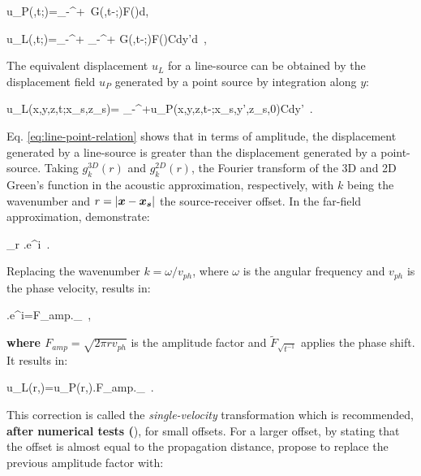 \documentclass[extra,mreferee]{gji}
\newenvironment{greennote}{\par\color{OliveGreen}}{\par}
\begin{document}
\begin{greennote}
\equation
u_{P}(,t;)=\int_{-\infty}^{+\infty}\ G(,t-\tau;)F(\tau)d\tau, 
\label{eq:point-displacement}
\endequation

\equation
u_{L}(,t;)=\int_{-\infty}^{+\infty} \int_{-\infty}^{+\infty} G(,t-\tau;)F(\tau)Cdy'd\tau\ , \label{eq:line-displacement}
\endequation

The equivalent displacement $u_{L}$ for a line-source can be obtained by the displacement field $u_{P}$ generated by a point source by integration along $y$:

\equation
u_{L}(x,y,z,t;x_{s},z_{s})= \int_{-\infty}^{+\infty}u_{P}(x,y,z,t-\tau;x_{s},y',z_{s},0)Cdy'\ .
\label{eq:line-point-relation}
\endequation

Eq. \ref{eq:line-point-relation} shows that in terms of amplitude, the displacement generated by a line-source is greater than the displacement generated by a point-source.
Taking $g_{k}^{3D}(r)$ and $g_{k}^{2D}(r)$, the Fourier transform of the 3D and 2D Green's function in the acoustic approximation, respectively, with $k$ being the wavenumber and $r=|\mitbf{x}-\mitbf{x_{s}}|$ the source-receiver offset. In the far-field approximation, \cite{Forbriger_LSS_2014} demonstrate:

\equation
\lim\limits_{r \rightarrow \infty} \approx {}.e^{i}\ .
\label{eq:far-field-frac}
\endequation

Replacing the wavenumber $k=\omega/v_{ph}$, where $\omega$ is the angular frequency and $v_{ph}$ is the phase velocity, results in:

\equation
{}.\sqrt{\frac{\pi}{\omega}}e^{i}=F_{amp}._{}\ ,
\endequation

\textbf{where $F_{amp}=\sqrt{2\pi r v_{ph}}$} is the amplitude factor and $\widetilde{F}_{\sqrt{t^{-1}}}$ applies the phase shift. It results in:

\equation
u_{L}(r,\omega)=u_{P}(r,\omega).F_{amp}._{}\ .
\label{eq:single-velocity}
\endequation

This correction is called the \textit{single-velocity} transformation which is recommended, \textbf{after numerical tests (\cite{Forbriger_LSS_2014, schafer_lss_2014}}), for small offsets. For a larger offset, by stating that the offset is almost equal to the propagation distance, \cite{schafer_lss_2014} propose to replace the previous amplitude factor with:


\end{greennote}
\end{document}
